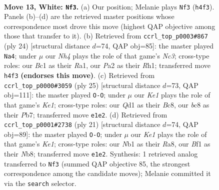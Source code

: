 \documentclass[11pt]{article}
\begin{document}
\begin{figure}[p]
\label{fig:thought-m22}
\end{figure}

\clearpage

\begin{figure}[p]\centering
\begin{subfigure}{0.46\textwidth}\centering
\resizebox{\linewidth}{!}{%
\newchessgame
\chessboard[
  setfen={r1b1k2r/4bp2/1qn1pnp1/p2p3p/3P3N/7P/PP3PP1/RNBQKBR1 w Qkq - 2 13},
  showmover=false,
  pgfstyle=straightmove, color=movearrow, markmove={h4-f3}
]}
\caption{}
\end{subfigure}\hfill
\begin{subfigure}{0.46\textwidth}\centering
\resizebox{\linewidth}{!}{%
\newchessgame
\chessboard[
  setfen={r1b1k2r/1p2bppp/p1p2n2/2Pp3q/1P6/2NBP3/PBQ2PPP/R3K2R w KQkq - 4 13},
  showmover=false,
  pgfstyle=straightmove, color=movearrow, markmove={c3-a4}
]}
\caption{}
\end{subfigure}
\\[4pt]
\begin{subfigure}{0.46\textwidth}\centering
\resizebox{\linewidth}{!}{%
\newchessgame
\chessboard[
  setfen={r1b1k2r/ppp1bp1p/n6q/3P1p2/2P1p3/2N3N1/PPQ1BPPP/R3K2R b KQkq - 1 13},
  showmover=false,
  pgfstyle=straightmove, color=movearrow, markmove={e8-g8}
]}
\caption{}
\end{subfigure}\hfill
\begin{subfigure}{0.46\textwidth}\centering
\resizebox{\linewidth}{!}{%
\newchessgame
\chessboard[
  setfen={rn2k2r/pb2qppp/1pp5/3p4/Q2P4/P3PN2/1P3PPP/R3KB1R b KQkq - 0 11},
  showmover=false,
  pgfstyle=straightmove, color=movearrow, markmove={e8-g8}
]}
\caption{}
\end{subfigure}
\caption{\textbf{Move 13, White: \texttt{Nf3}.} (a) Our position; Melanie plays \texttt{Nf3} (\texttt{h4f3}). Panels (b)--(d) are the retrieved master positions whose correspondence most drove this move (highest QAP objective among those that transfer to it). (b) Retrieved from \texttt{ccrl\_top\_p0003\#867} (ply 24) [structural distance $d$=74, QAP obj=85]: the master played \texttt{Na4}; under $\mu$ our \emph{Nh4} plays the role of that game's \emph{Nc3}; cross-type roles: our \emph{B}c1 as their \emph{R}a1, our \emph{P}a2 as their \emph{R}h1; transferred move \texttt{h4f3} \textbf{(endorses this move)}. (c) Retrieved from \texttt{ccrl\_top\_p0000\#3059} (ply 25) [structural distance $d$=73, QAP obj=111]: the master played \texttt{O-O}; under $\mu$ our \emph{Ke1} plays the role of that game's \emph{Ke1}; cross-type roles: our \emph{Q}d1 as their \emph{B}c8, our \emph{b}c8 as their \emph{P}b7; transferred move \texttt{e1e2}. (d) Retrieved from \texttt{ccrl\_top\_p0001\#2738} (ply 21) [structural distance $d$=74, QAP obj=89]: the master played \texttt{O-O}; under $\mu$ our \emph{Ke1} plays the role of that game's \emph{Ke1}; cross-type roles: our \emph{N}b1 as their \emph{R}a8, our \emph{B}f1 as their \emph{N}b8; transferred move \texttt{e1e2}. Synthesis: 1 retrieved analog transferred to \texttt{Nf3} (summed QAP objective 85, the strongest correspondence among the candidate moves); Melanie committed it via the \texttt{search} selector.}
\label{fig:thought-m24}
\end{figure}
\end{document}
